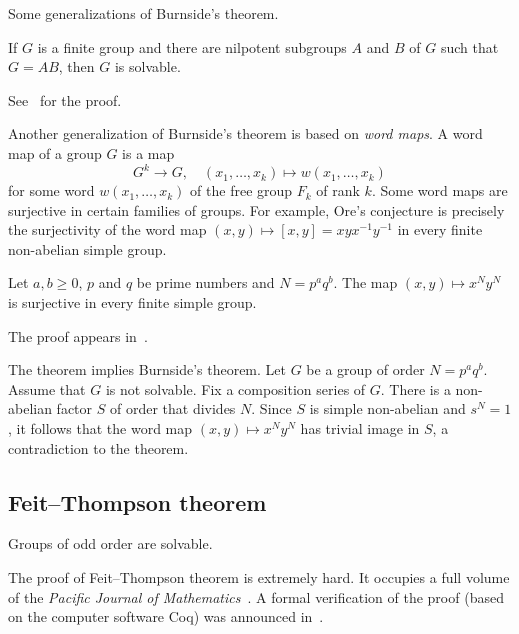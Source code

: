 Some generalizations of Burnside's theorem. 

\begin{theorem}
    \label{thm:KegelWielandt}
    If $G$ is a finite group and there are nilpotent subgroups 
    $A$ and $B$ of $G$ such that 
    $G=AB$, then $G$ is solvable.
\end{theorem}

See~\cite[Theorem 2.4.3]{MR1211633} for the proof.


Another generalization of Burnside's theorem
is based on \emph{word maps}. A word map
of a group $G$ is a map 
\[
G^k\to G,\quad 
(x_1,\dots,x_k)\mapsto w(x_1,\dots,x_k)
\]
for some word $w(x_1,\dots,x_k)$ of the free group $F_k$ of rank $k$. 
Some word maps are surjective in certain families of groups. For example, 
Ore's conjecture is precisely the surjectivity of the word map
$(x,y)\mapsto [x,y]=xyx^{-1}y^{-1}$ in every finite non-abelian simple 
group. 

\begin{theorem}
    Let $a,b\geq0$, $p$ and $q$ be prime numbers and $N=p^aq^b$. The map 
    $(x,y)\mapsto x^Ny^N$ is surjective in every finite simple group. 
\end{theorem}

The proof appears in~\cite{MR3827208}. 

The theorem implies Burnside's theorem. Let $G$ be a group of order
$N=p^aq^b$. Assume that $G$ is not solvable. 
Fix a composition series of $G$. There is a non-abelian factor $S$ 
of order that divides $N$. Since 
$S$ is simple non-abelian and $s^N=1$, it follows that the word map
$(x,y)\mapsto x^Ny^N$ has trivial image in $S$, a contradiction 
to the theorem. 

\subsection{Feit--Thompson theorem}

\begin{theorem}
    Groups of odd order are solvable. 
\end{theorem}

The proof of Feit--Thompson theorem is extremely hard. 
It occupies a full volume of the 
\emph{Pacific Journal of Mathematics}~\cite{MR166261}. 
A formal verification of the proof 
(based on the computer software Coq) 
was announced in~\cite{MR3111271}.  

